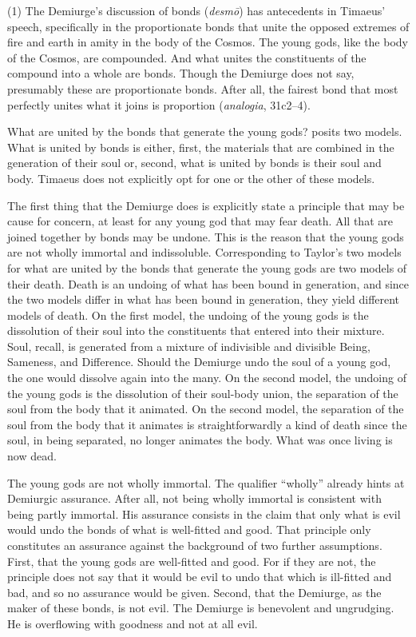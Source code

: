 (1) The Demiurge's discussion of bonds (\emph{desmō}) has antecedents in Timaeus' speech, specifically in the proportionate bonds that unite the opposed extremes of fire and earth in amity in the body of the Cosmos. The young gods, like the body of the Cosmos, are compounded. And what unites the constituents of the compound into a whole are bonds. Though the Demiurge does not say, presumably these are proportionate bonds. After all, the fairest bond that most perfectly unites what it joins is proportion (\emph{analogia}, 31c2--4). 

What are united by the bonds that generate the young gods? \citet[]{Taylor:1928qb} posits two models. What is united by bonds is either, first, the materials that are combined in the generation of their soul or, second, what is united by bonds is their soul and body. Timaeus does not explicitly opt for one or the other of these models.

The first thing that the Demiurge does is explicitly state a principle that may be cause for concern, at least for any young god that may fear death. All that are joined together by bonds may be undone. This is the reason that the young gods are not wholly immortal and indissoluble. Corresponding to Taylor's two models for what are united by the bonds that generate the young gods are two models of their death. Death is an undoing of what has been bound in generation, and since the two models differ in what has been bound in generation, they yield different models of death. On the first model, the undoing of the young gods is the dissolution of their soul into the constituents that entered into their mixture. Soul, recall, is generated from a mixture of indivisible and divisible Being, Sameness, and Difference. Should the Demiurge undo the soul of a young god, the one would dissolve again into the many. On the second model, the undoing of the young gods is the dissolution of their soul-body union, the separation of the soul from the body that it animated. On the second model, the separation of the soul from the body that it animates is straightforwardly a kind of death since the soul, in being separated, no longer animates the body. What was once living is now dead. 

The young gods are not wholly immortal. The qualifier ``wholly'' already hints at Demiurgic assurance. After all, not being wholly immortal is consistent with being partly immortal. His assurance consists in the claim that only what is evil would undo the bonds of what is well-fitted and good. That principle only constitutes an assurance against the background of two further assumptions. First, that the young gods are well-fitted and good. For if they are not, the principle does not say that it would be evil to undo that which is ill-fitted and bad, and so no assurance would be given. Second, that the Demiurge, as the maker of these bonds, is not evil. The Demiurge is benevolent and ungrudging. He is overflowing with goodness and not at all evil. 

